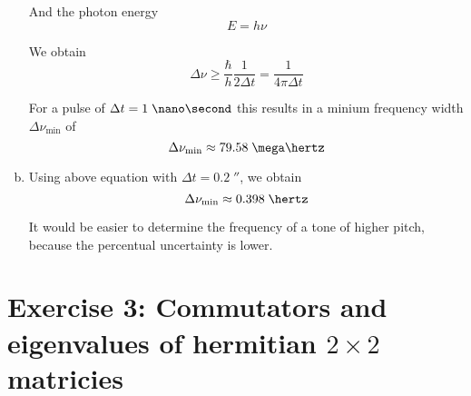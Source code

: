 \documentclass[a4paper,german,12pt,smallheadings]{scrartcl}
\begin{document}
\begin{enumerate}[a)]
    And the photon energy
    \begin{equation*}
      E = h \nu
    \end{equation*}

    We obtain
    \begin{equation*}
      \Delta \nu \ge \frac{\hbar}{h} \frac{1}{2 \Delta t} = \frac{1}{4 \pi \Delta t}
    \end{equation*}

    For a pulse of $\Delta t = 1 \; \nano\second$ this results in a minium frequency width $\Delta \nu_\text{min}$ of
    \begin{equation*}
      \Delta \nu_\text{min} \approx 79.58 \; \mega\hertz
    \end{equation*}
  \item
    Using above equation with $\Delta t = 0.2 \; \second$, we obtain
    \begin{equation*}
      \Delta \nu_\text{min} \approx 0.398 \; \hertz
    \end{equation*}

    It would be easier to determine the frequency of a tone of higher pitch,
    because the percentual uncertainty is lower.
\end{enumerate}
\section*{Exercise 3: Commutators and eigenvalues of hermitian $2 \times 2$ matricies}
\end{document}
